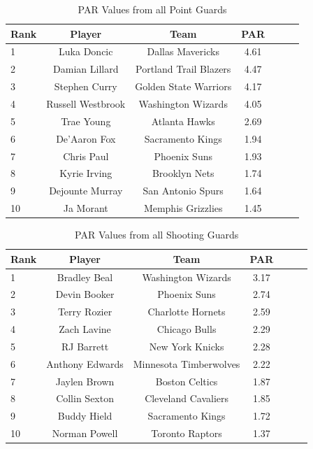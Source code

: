 \documentclass[titlepage, 12pt]{article}
\begin{document}
\begin{table}[tbp]
  \caption{PAR Values from all Point Guards}
  \label{tab:PGtable}
\centering
\begin{tabular}[t]{lcccccc}
  \toprule
  Rank & Player & Team & PAR\\
  \midrule
 1 & Luka Doncic & Dallas Mavericks & 4.61\\
 2 & Damian Lillard & Portland Trail Blazers & 4.47\\
 3 & Stephen Curry & Golden State Warriors & 4.17\\
 4 & Russell Westbrook & Washington Wizards & 4.05\\
 5 & Trae Young & Atlanta Hawks & 2.69\\
 6 & De'Aaron Fox & Sacramento Kings & 1.94\\
 7 & Chris Paul & Phoenix Suns & 1.93\\
 8 & Kyrie Irving & Brooklyn Nets & 1.74\\
 9 & Dejounte Murray & San Antonio Spurs & 1.64\\
 10 & Ja Morant & Memphis Grizzlies & 1.45\\
  \bottomrule
\end{tabular}
\end{table}

\begin{table}[tbp]
  \caption{PAR Values from all Shooting Guards}
  \label{tab:SGtable}
\centering
\begin{tabular}[t]{lcccccc}
  \toprule
  Rank & Player & Team & PAR\\
  \midrule
 1 & Bradley Beal & Washington Wizards & 3.17\\
 2 & Devin Booker & Phoenix Suns & 2.74\\
 3 & Terry Rozier & Charlotte Hornets & 2.59\\
 4 & Zach Lavine & Chicago Bulls & 2.29\\
 5 & RJ Barrett & New York Knicks & 2.28\\
 6 & Anthony Edwards & Minnesota Timberwolves & 2.22\\
 7 & Jaylen Brown & Boston Celtics & 1.87\\
 8 & Collin Sexton & Cleveland Cavaliers & 1.85\\
 9 & Buddy Hield & Sacramento Kings & 1.72\\
 10 & Norman Powell & Toronto Raptors & 1.37\\
  \bottomrule
\end{tabular}
\end{table}
\end{document}

